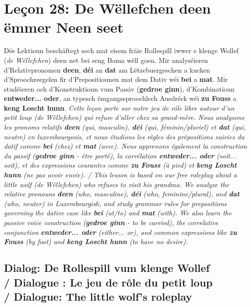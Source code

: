 \chapter{Leçon 28: De Wëllefchen deen ëmmer Neen seet}

Dës Lektioun beschäftegt sech mat eisem fräie Rollespill iwwer e klenge Wollef (\textit{de Wëllefchen}) deen net bei seng Boma wëll goen. Mir analyséieren d'Relativpronomen \textbf{deen}, \textbf{déi} an \textbf{dat} am Lëtzebuergeschen a kucken d'Sproochreegelen fir d'Prepositiounen mat dem Dativ wéi \textbf{bei} a \textbf{mat}. Mir studéieren och d'Konstruktioun vum Passiv (\textbf{gedroe ginn}), d'Kombinatioun \textbf{entweder... oder}, an typesch ëmgangssproochlech Ausdréck wéi \textbf{zu Fouss} a \textbf{keng Loscht hunn}. \textit{Cette leçon porte sur notre jeu de rôle libre autour d'un petit loup (\textit{de Wëllefchen}) qui refuse d'aller chez sa grand-mère. Nous analysons les pronoms relatifs \textbf{deen} (qui, masculin), \textbf{déi} (qui, féminin/pluriel) et \textbf{dat} (qui, neutre) en luxembourgeois, et nous étudions les règles des prépositions suivies du datif comme \textbf{bei} (chez) et \textbf{mat} (avec). Nous apprenons également la construction du passif (\textbf{gedroe ginn} - être porté), la corrélation \textbf{entweder... oder} (soit... soit), et des expressions courantes comme \textbf{zu Fouss} (à pied) et \textbf{keng Loscht hunn} (ne pas avoir envie). / This lesson is based on our free roleplay about a little wolf (\textit{de Wëllefchen}) who refuses to visit his grandma. We analyze the relative pronouns \textbf{deen} (who, masculine), \textbf{déi} (who, feminine/plural), and \textbf{dat} (who, neuter) in Luxembourgish, and study grammar rules for prepositions governing the dative case like \textbf{bei} (at/to) and \textbf{mat} (with). We also learn the passive voice construction (\textbf{gedroe ginn} - to be carried), the correlative conjunction \textbf{entweder... oder} (either... or), and common expressions like \textbf{zu Fouss} (by foot) and \textbf{keng Loscht hunn} (to have no desire).}

\vspace{1em}

\section[Dialog: De Rollespill vum klenge Wollef / Jeu de rôle / Roleplay Dialogue]{Dialog: De Rollespill vum klenge Wollef \\/ Dialogue : Le jeu de rôle du petit loup \\/ Dialogue: The little wolf's roleplay}

